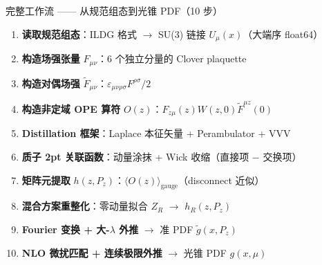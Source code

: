 \documentclass[10pt,aspectratio=169]{beamer}
\newcommand{\Pz}{P_z}
\begin{document}
\begin{frame}{完整工作流 —— 从规范组态到光锥 PDF（10 步）}
\small
\begin{enumerate}
  \item[1.] \textbf{读取规范组态}：ILDG 格式 $\to$ SU(3) 链接 $U_\mu(x)$（大端序 float64）
  \item[2.] \textbf{构造场强张量} $F_{\mu\nu}$：6 个独立分量的 Clover plaquette
  \item[3.] \textbf{构造对偶场强} $\tilde{F}_{\mu\nu}$：$\varepsilon_{\mu\nu\rho\sigma} F^{\rho\sigma} / 2$
  \item[4.] \textbf{构造非定域 OPE 算符} $O(z)$：$F_{z\mu}(z) W(z,0) \tilde{F}^{\mu z}(0)$
  \item[5.] \textbf{Distillation 框架}：Laplace 本征矢量 + Perambulator + VVV
  \item[6.] \textbf{质子 2pt 关联函数}：动量涂抹 + Wick 收缩（直接项 $-$ 交换项）
  \item[7.] \textbf{矩阵元提取} $h(z, \Pz)$：$\langle O(z) \rangle_{\text{gauge}}$（disconnect 近似）
  \item[8.] \textbf{混合方案重整化}：零动量拟合 $Z_R$ $\to$ $h_R(z, \Pz)$
  \item[9.] \textbf{Fourier 变换 + 大-$\lambda$ 外推} $\to$ 准 PDF $\tilde{g}(x, \Pz)$
  \item[10.] \textbf{NLO 微扰匹配 + 连续极限外推} $\to$ 光锥 PDF $g(x, \mu)$
\end{enumerate}

\begin{center}
\end{center}
\end{frame}
\end{document}
